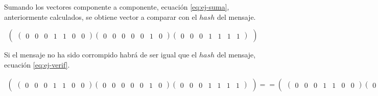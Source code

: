 Sumando los vectores componente a componente, ecuación \ref{eq:ej-suma}, anteriormente calculados, se obtiene vector a comparar con el $hash$ del mensaje. 

\begin{equation}\label{eq:ej-suma}
	\left(\begin{matrix}
		\left(\begin{smallmatrix}0 & 0 & 0 & 1 & 1 & 0 & 0\end{smallmatrix}\right)
		\left(\begin{smallmatrix}0 & 0 & 0 & 0 & 0 & 1 & 0\end{smallmatrix}\right)
		\left(\begin{smallmatrix}0 & 0 & 0 & 1 & 1 & 1 & 1\end{smallmatrix}\right)
	\end{matrix}\right)
\end{equation}

Si el mensaje no ha sido corrompido habrá de ser igual que el $hash$ del mensaje, ecuación \ref{eq:ej-verif}.

\begin{equation}\label{eq:ej-verif}
	\begin{aligned}
	\left(\begin{matrix}
		\left(\begin{smallmatrix}0 & 0 & 0 & 1 & 1 & 0 & 0\end{smallmatrix}\right)
		\left(\begin{smallmatrix}0 & 0 & 0 & 0 & 0 & 1 & 0\end{smallmatrix}\right)
		\left(\begin{smallmatrix}0 & 0 & 0 & 1 & 1 & 1 & 1\end{smallmatrix}\right)
	\end{matrix}\right)==\left(\begin{matrix}
		\left(\begin{smallmatrix}0 & 0 & 0 & 1 & 1 & 0 & 0\end{smallmatrix}\right)
		\left(\begin{smallmatrix}0 & 0 & 0 & 0 & 0 & 1 & 0\end{smallmatrix}\right)
		\left(\begin{smallmatrix}0 & 0 & 0 & 1 & 1 & 1 & 1\end{smallmatrix}\right)
	\end{matrix}\right)
	\end{aligned}
\end{equation}























